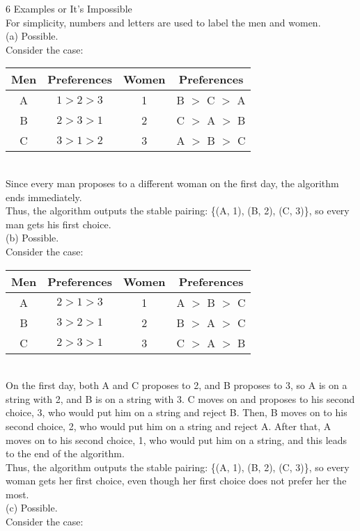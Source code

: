 \documentclass{article}
\begin{document}
{\Large 6 Examples or It’s Impossible} \\[.5cm]
For simplicity, numbers and letters are used to label the men and women.\\[.3cm]
(a) Possible.\\[.15cm]
\indent Consider the case:\\[.3cm]
\begin{tabular}{ | c | c || c | c | }
\hline
Men & Preferences & Women & Preferences \\
\hline
A & $1>2>3$ & 1 & B $>$ C $>$ A \\
B & $2>3>1$ & 2 & C $>$ A $>$ B \\
C & $3>1>2$ & 3 & A $>$ B $>$ C \\
\hline
\end{tabular}\\[.3cm]
\indent Since every man proposes to a different woman on the first day, the algorithm ends immediately.\\
\indent Thus, the algorithm outputs the stable pairing: \{(A, 1), (B, 2), (C, 3)\}, so every man gets his first choice.\\[.5cm]
(b) Possible.\\[.5cm]
\indent Consider the case:\\[.3cm]
\begin{tabular}{ | c | c || c | c | }
\hline
Men & Preferences & Women & Preferences \\
\hline
A & $2>1>3$ & 1 & A $>$ B $>$ C \\
B & $3>2>1$ & 2 & B $>$ A $>$ C \\
C & $2>3>1$ & 3 & C $>$ A $>$ B \\
\hline
\end{tabular}\\[.3cm]
\indent On the first day, both A and C proposes to 2, and B proposes to 3, so A is on a string with 2, and B is on a string with 3. C moves on and proposes to his second choice, 3, who would put him on a string and reject B. Then, B moves on to his second choice, 2, who would put him on a string and reject A. After that, A moves on to his second choice, 1, who would put him on a string, and this leads to the end of the algorithm.\\
\indent Thus, the algorithm outputs the stable pairing: \{(A, 1), (B, 2), (C, 3)\}, so every woman gets her first choice, even though her first choice does not prefer her the most.\\[.5cm]
(c) Possible.\\[.15cm]
\indent Consider the case:\\[.3cm]
\end{document}
